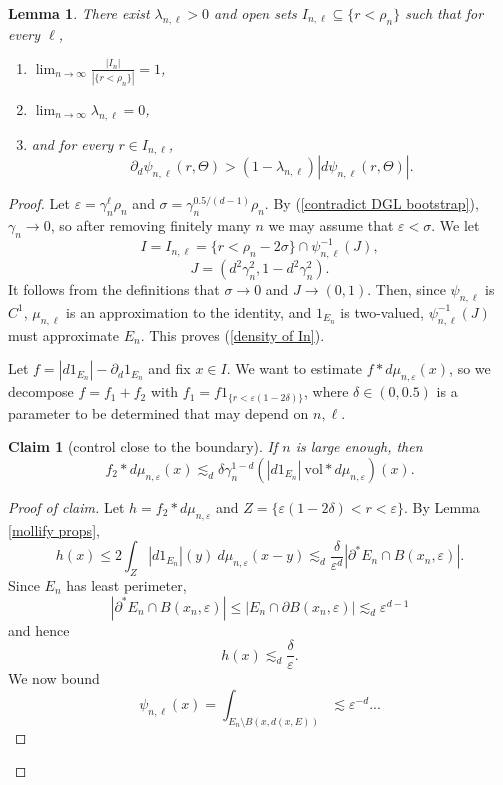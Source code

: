 \documentclass[reqno,12pt,letterpaper]{amsart}
\newcommand{\vol}{\mathrm{vol}}
\newtheorem{lemma}[theorem]{Lemma}
\newtheorem{claim}[theorem]{Claim}
\theoremstyle{definition}
\numberwithin{equation}{section}
\begin{document}
\begin{lemma}
There exist $\lambda_{n, \ell} > 0$ and open sets $I_{n, \ell} \subseteq \{r < \rho_n\}$ such that for every $\ell$,
\begin{enumerate}
\item \label{density of In} $\lim_{n \to \infty} \frac{|I_n|}{|\{r < \rho_n\}|} = 1$,
\item $\lim_{n \to \infty} \lambda_{n, \ell} = 0$,
\item and for every $r \in I_{n, \ell}$,
$$\partial_d \psi_{n, \ell}(r, \Theta) > (1 - \lambda_{n, \ell})|d\psi_{n, \ell}(r, \Theta)|.$$
\end{enumerate}
\end{lemma}
\begin{proof}
Let $\varepsilon = \gamma_n^\ell \rho_n$ and $\sigma = \gamma_n^{0.5/(d - 1)} \rho_n$.
By (\ref{contradict DGL bootstrap}), $\gamma_n \to 0$, so after removing finitely many $n$ we may assume that $\varepsilon < \sigma$.
We let
$$I = I_{n, \ell} = \{r < \rho_n - 2\sigma\} \cap \psi_{n, \ell}^{-1}(J),$$
$$J = (d^2 \gamma_n^2, 1 - d^2 \gamma_n^2).$$
It follows from the definitions that $\sigma \to 0$ and $J \to (0, 1)$.
Then, since $\psi_{n, \ell}$ is $C^1$, $\mu_{n, \ell}$ is an approximation to the identity, and $1_{E_n}$ is two-valued, $\psi_{n, \ell}^{-1}(J)$ must approximate $E_n$.
This proves (\ref{density of In}).

Let $f = |d1_{E_n}| - \partial_d 1_{E_n}$ and fix $x \in I$.
We want to estimate $f * d\mu_{n, \varepsilon}(x)$, so we decompose $f = f_1 + f_2$ with $f_1 = f1_{\{r < \varepsilon(1 - 2\delta)\}}$, where $\delta \in (0, 0.5)$ is a parameter to be determined that may depend on $n, \ell$.

\begin{claim}[control close to the boundary]
If $n$ is large enough, then
$$f_2 * d\mu_{n, \varepsilon}(x) \lesssim_d \delta \gamma_n^{1 - d} (|d1_{E_n}|~\vol * d\mu_{n, \varepsilon})(x).$$
\end{claim}
\begin{proof}[Proof of claim]
Let $h = f_2 * d\mu_{n, \varepsilon}$ and $Z = \{\varepsilon(1 - 2\delta) < r < \varepsilon\}$.
By Lemma \ref{mollify props},
$$h(x) \leq 2 \int_Z |d1_{E_n}|(y) ~d\mu_{n, \varepsilon}(x - y) \lesssim_d \frac{\delta}{\varepsilon^d} |\partial^* E_n \cap B(x_n, \varepsilon)|.$$
Since $E_n$ has least perimeter,
$$|\partial^* E_n \cap B(x_n, \varepsilon)| \leq |E_n \cap \partial B(x_n, \varepsilon)| \lesssim_d \varepsilon^{d - 1}$$
and hence
$$h(x) \lesssim_d \frac{\delta}{\varepsilon}.$$
We now bound
$$\psi_{n, \ell}(x) = \int_{E_n \setminus B(x, d(x, E))} \lesssim \varepsilon^{-d}...$$
\end{proof}


\end{proof}
\end{document}
